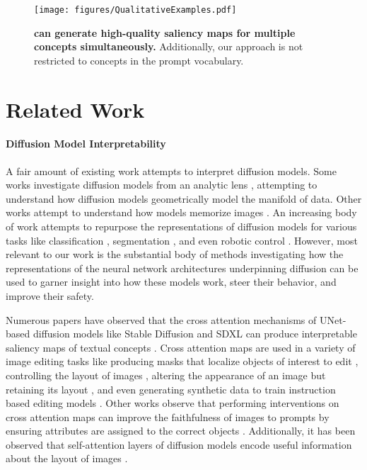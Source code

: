 \begin{figure*}
    \centering
    \texttt{[image: figures/QualitativeExamples.pdf]}
    \vspace{-0.1in}
    \caption{\textbf{\tool{} can generate high-quality saliency maps for multiple concepts simultaneously. } Additionally, our approach is not restricted to concepts in the prompt vocabulary. }
    \label{fig:multi_class_qualitative_segmentation}
\end{figure*}

\section{Related Work}

\paragraph{Diffusion Model Interpretability}

A fair amount of existing work attempts to interpret diffusion models. Some works investigate diffusion models from an analytic lens \cite{kadkhodaie_generalization_2024, wang_diffusion_2024}, attempting to understand how diffusion models geometrically model the manifold of data. Other works attempt to understand how models memorize images \cite{carlini_extracting_2023}. An increasing body of work attempts to repurpose the representations of diffusion models for various tasks like classification \cite{li_your_2023}, segmentation \cite{karazija_diffusion_2024}, and even robotic control \cite{gupta_pre-trained_2024}. However, most relevant to our work is the substantial body of methods investigating how the representations of the neural network architectures underpinning diffusion can be used to garner insight into how these models work, steer their behavior, and improve their safety. 

Numerous papers have observed that the cross attention mechanisms of UNet-based diffusion models like Stable Diffusion \cite{rombach_high-resolution_2022} and SDXL \cite{podell_sdxl_2023} can produce interpretable saliency maps of textual concepts \cite{tang_what_2022}. Cross attention maps are used in a variety of image editing tasks like producing masks that localize objects of interest to edit \cite{dalva_fluxspace_2024}, controlling the layout of images \cite{chen_training-free_2023, epstein_diffusion_2023}, altering the appearance of an image but retaining its layout \cite{hertz_prompt--prompt_2022}, and even generating synthetic data to train instruction based editing models \cite{brooks_instructpix2pix_2023}. Other works observe that performing interventions on cross attention maps can improve the faithfulness of images to prompts by ensuring attributes are assigned to the correct objects \cite{meral_conform_2024, chefer_attend-and-excite_2023}.  Additionally, it has been observed that self-attention layers of diffusion models encode useful information about the layout of images \cite{liu_towards_2024}. 

